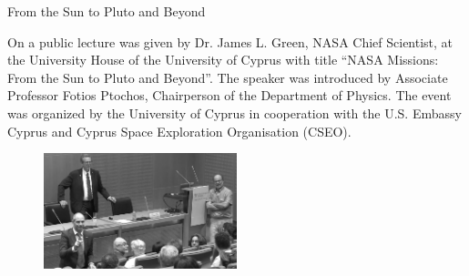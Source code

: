 \begin{MyArticle}[enhanced, tikz={rotate=0}, width=1.0\textwidth]{From the Sun to Pluto and Beyond}
  \begin{multicols}{2}
  On \longdate{} a public lecture was given by Dr. James L. Green, NASA Chief Scientist, at
  the University House  of the University
  of Cyprus with title ``NASA Missions: From the Sun to Pluto and Beyond''. The speaker was introduced by Associate Professor Fotios
  Ptochos, Chairperson of the Department of Physics. The event was
  organized by the University of Cyprus in cooperation with the
  U.S. Embassy Cyprus and Cyprus Space Exploration Organisation (CSEO).
  \vspace{-5mm}
  \begin{figure}
    \begin{center}
      \leavevmode
      \includegraphics[width=0.5\textwidth]{./figures/NASA-small.png}
    \end{center}
  \end{figure}
  \end{multicols} 
\end{MyArticle}

